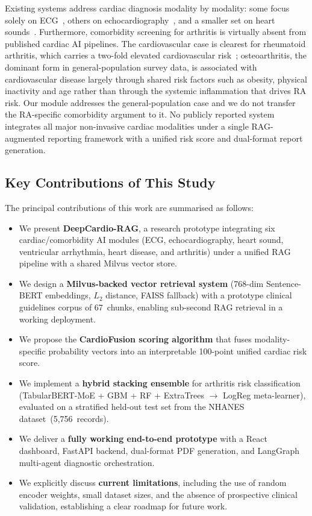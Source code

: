 \documentclass[AMA,STIX1COL,]{WileyNJD-v2}
\begin{document}
Existing systems address cardiac diagnosis modality by modality: some
focus solely on ECG~\cite{hannun2019,rajpurkar2017,ribeiro2020},
others on echocardiography~\cite{ouyang2020,zhang2018,madani2018}, and
a smaller set on heart sounds~\cite{clifford2016,potes2016}.
Furthermore, comorbidity screening for arthritis is virtually absent
from published cardiac AI pipelines. The cardiovascular case is
clearest for rheumatoid arthritis, which carries a two-fold elevated
cardiovascular risk~\cite{avinazubieta2008}; osteoarthritis, the
dominant form in general-population survey data, is associated with
cardiovascular disease largely through shared risk factors such as
obesity, physical inactivity and age rather than through the systemic
inflammation that drives RA risk. Our module addresses the
general-population case and we do not transfer the RA-specific
comorbidity argument to it. No publicly reported system integrates all major
non-invasive cardiac modalities under a single RAG-augmented reporting
framework with a unified risk score and dual-format report generation.

\subsection{Key Contributions of This Study}

The principal contributions of this work are summarised as follows:

\begin{itemize}
  \item We present \textbf{DeepCardio-RAG}, a research prototype
        integrating six cardiac/comorbidity AI modules (ECG,
        echocardiography, heart sound, ventricular arrhythmia, heart
        disease, and arthritis) under a unified RAG pipeline with a
        shared Milvus vector store.
  \item We design a \textbf{Milvus-backed vector retrieval system}
        (768-dim Sentence-BERT embeddings, $L_2$ distance, FAISS
        fallback) with a prototype clinical guidelines corpus of
        67~chunks, enabling sub-second RAG retrieval in a working
        deployment.
  \item We propose the \textbf{CardioFusion scoring algorithm} that
        fuses modality-specific probability vectors into an
        interpretable 100-point unified cardiac risk score.
  \item We implement a \textbf{hybrid stacking ensemble} for arthritis
        risk classification (TabularBERT-MoE + GBM + RF + ExtraTrees
        $\rightarrow$ LogReg meta-learner), evaluated on a
        stratified held-out test set from the NHANES dataset~(5,756~records).
  \item We deliver a \textbf{fully working end-to-end prototype} with
        a React dashboard, FastAPI backend, dual-format PDF generation,
        and LangGraph multi-agent diagnostic orchestration.
  \item We explicitly discuss \textbf{current limitations}, including
        the use of random encoder weights, small dataset sizes, and the
        absence of prospective clinical validation, establishing a clear
        roadmap for future work.
\end{itemize}
\end{document}
